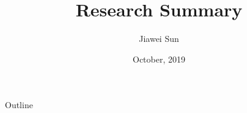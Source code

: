 \documentclass{beamer}
\title{Research Summary}
\author{Jiawei Sun}
\institute[sunmessi@umich.edu] %
{\\


  \textbf{Electrical and Computer Engineering}\\
  \\
  \textbf{University of Michigan}\\

 }
\date{October, 2019}
\begin{document}
\begin{frame}
  \titlepage
\end{frame}

\begin{frame}{Outline}
  \tableofcontents
\end{frame}

%
%
%
%
%
\end{document}
